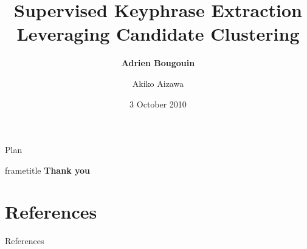 \documentclass[xcolor={usenames, dvipsnames}]{beamer}
\title{Supervised Keyphrase Extraction Leveraging Candidate Clustering}
\subtitle{}
\author{\textbf{Adrien Bougouin} \and Akiko Aizawa}
\institute{\normalsize{NII, Tokyo (JAPAN)}}
\date{3 October 2010}
\begin{document}
  \renewcommand*{\theenumii}{\alph{enumii}}
  \renewcommand*{\theenumiii}{\roman{enumiii}}

  \begin{frame}
    \titlepage
  \end{frame}
  \setcounter{framenumber}{0}

  
  \begin{frame}{Plan}
    \tableofcontents
  \end{frame}
  
  
  
  
  \begin{frame}
    \vfill
    \begin{beamercolorbox}[center,shadow=true,rounded=true]{frametitle} 
      \Huge{\textbf{Thank you}}
    \end{beamercolorbox} 
    \vfill
  \end{frame}
  \section*{References}
    \begin{frame}[allowframebreaks]{References}
      \def\newblock{\hskip .11em plus .33em minus .07em}
      
      
    \end{frame}
\end{document}
